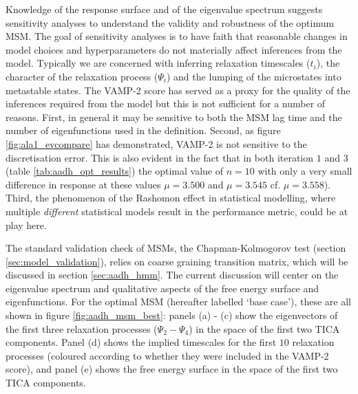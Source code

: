 Knowledge of the response surface and of the eigenvalue spectrum suggests sensitivity analyses to understand the validity and robustness of the optimum MSM.  The goal of sensitivity analyses is to have faith that reasonable changes in model choices and hyperparameters do not materially affect inferences from the model. Typically we are concerned with inferring relaxation timescales ($t_{i}$), the character of the relaxation process ($\Psi_{i}$) and the lumping of the microstates into metastable states. The VAMP-2 score has served as a proxy for the quality of the inferences required from the model but this is not sufficient  for a number of reasons.  First, in general it may be sensitive to both the MSM lag time and the number of eigenfunctions used in the definition. Second, as figure \ref{fig:ala1_evcompare} has demonstrated, VAMP-2 is not sensitive to the discretisation error. This is also evident in the fact that in both iteration $1$ and $3$ (table \ref{tab:aadh_opt_results}) the optimal value of $n=10$ with only a very small difference in response at these values $\mu = 3.500$ and   $\mu=3.545$ cf. $\mu=3.558$). Third, the phenomenon of the Rashomon effect\cite{breiman2001} in statistical modelling, where  multiple \emph{different} statistical models result in the performance metric, could be at play here.

The standard validation check of MSMs, the Chapman-Kolmogorov test (section \ref{sec:model_validation}), relies on coarse graining transition matrix, which will be discussed in section \ref{sec:aadh_hmm}. The current discussion will center on the eigenvalue spectrum and qualitative aspects of the free energy surface and eigenfunctions. For the optimal MSM (hereafter labelled `base case'), these are all shown in figure \ref{fig:aadh_msm_best}: panels (a) - (c) show the eigenvectors of the first three relaxation processes ($\Psi_{2} - \Psi_{4}$) in the space of the first two TICA components. Panel (d) shows the implied timescales for the first $10$ relaxation processes (coloured according to whether they were included in the VAMP-2 score), and panel (e) shows the free energy surface in the space of the first two TICA components.


